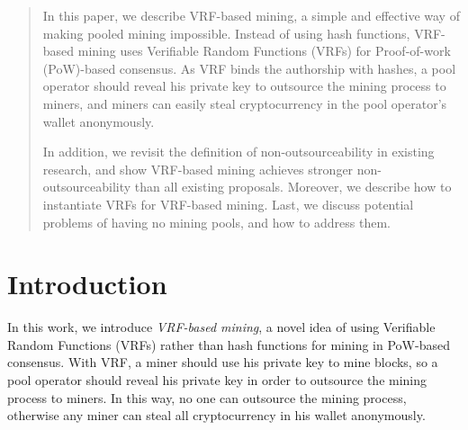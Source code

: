 \documentclass[a0,portrait]{a0poster}
\begin{document}
\begin{multicols}{2} %


    \color{Navy} %

    \begin{abstract}
        In this paper, we describe VRF-based mining, a simple and effective way of making pooled mining impossible.
        Instead of using hash functions, VRF-based mining uses Verifiable Random Functions (VRFs) for Proof-of-work (PoW)-based consensus.
        As VRF binds the authorship with hashes, a pool operator should reveal his private key to outsource the mining process to miners, and miners can easily steal cryptocurrency in the pool operator's wallet anonymously.

        In addition, we revisit the definition of non-outsourceability in existing research, and show VRF-based mining achieves stronger non-outsourceability than all existing proposals.
        Moreover, we describe how to instantiate VRFs for VRF-based mining.
        Last, we discuss potential problems of having no mining pools, and how to address them.
    \end{abstract}


    \color{SaddleBrown} %

    \section*{Introduction}

    In this work, we introduce \textit{VRF-based mining}, a novel idea of using Verifiable Random Functions (VRFs) rather than hash functions for mining in PoW-based consensus.
    With VRF, a miner should use his private key to mine blocks, so a pool operator should reveal his private key in order to outsource the mining process to miners.
    In this way, no one can outsource the mining process, otherwise any miner can steal all cryptocurrency in his wallet anonymously.


\end{multicols}
\end{document}
